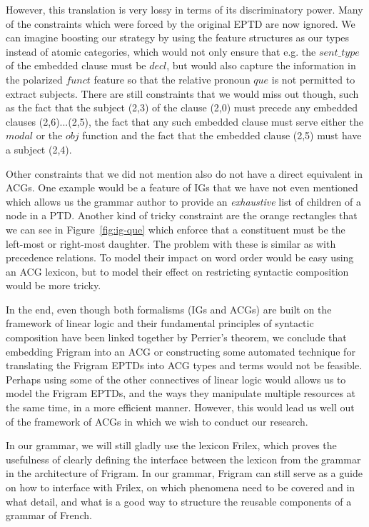However, this translation is very lossy in terms of its discriminatory
power. Many of the constraints which were forced by the original EPTD
are now ignored. We can imagine boosting our strategy by using the
feature structures as our types instead of atomic categories, which
would not only ensure that e.g. the $sent\_type$ of the embedded clause
must be $decl$, but would also capture the information in the polarized
$funct$ feature so that the relative pronoun $que$ is not permitted to
extract subjects. There are still constraints that we would miss out
though, such as the fact that the subject (2,3) of the clause (2,0) must
precede any embedded clauses (2,6)...(2,5), the fact that any such
embedded clause must serve either the $modal$ or the $obj$ function and
the fact that the embedded clause (2,5) must have a subject (2,4).

Other constraints that we did not mention also do not have a direct
equivalent in ACGs. One example would be a feature of IGs that we have
not even mentioned which allows us the grammar author to provide an
\emph{exhaustive} list of children of a node in a PTD. Another kind of
tricky constraint are the orange rectangles that we can see in
Figure~\ref{fig:ig-que} which enforce that a constituent must be the
left-most or right-most daughter. The problem with these is similar as
with precedence relations. To model their impact on word order would be
easy using an ACG lexicon, but to model their effect on restricting
syntactic composition would be more tricky.

In the end, even though both formalisms (IGs and ACGs) are built on the
framework of linear logic and their fundamental principles of syntactic
composition have been linked together by Perrier's theorem, we conclude
that embedding Frigram into an ACG or constructing some automated
technique for translating the Frigram EPTDs into ACG types and terms
would not be feasible. Perhaps using some of the other connectives of
linear logic would allows us to model the Frigram EPTDs, and the ways
they manipulate multiple resources at the same time, in a more efficient
manner. However, this would lead us well out of the framework of ACGs in
which we wish to conduct our research.

In our grammar, we will still gladly use the lexicon Frilex, which
proves the usefulness of clearly defining the interface between the
lexicon from the grammar in the architecture of Frigram. In our grammar,
Frigram can still serve as a guide on how to interface with Frilex, on
which phenomena need to be covered and in what detail, and what is a
good way to structure the reusable components of a grammar of French.
